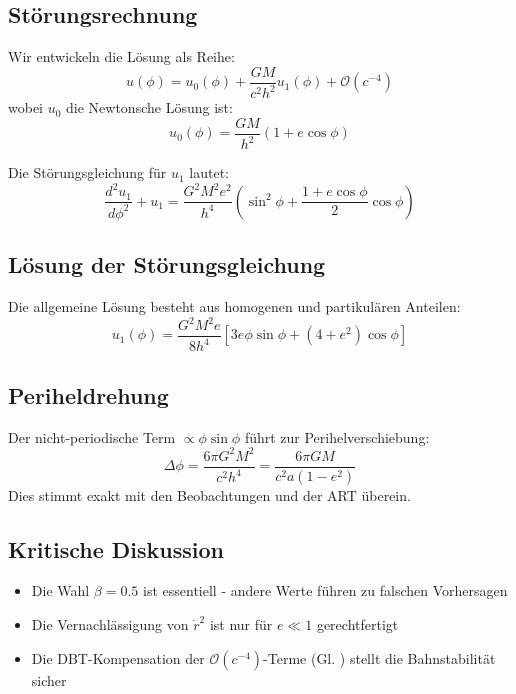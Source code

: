 \subsection{Störungsrechnung}
Wir entwickeln die Lösung als Reihe:
\begin{equation}
u(\phi) = u_0(\phi) + \frac{GM}{c^2h^2}u_1(\phi) + \mathcal{O}(c^{-4})
\end{equation}
wobei $u_0$ die Newtonsche Lösung ist:
\begin{equation}
u_0(\phi) = \frac{GM}{h^2}(1 + e\cos\phi)
\end{equation}

Die Störungsgleichung für $u_1$ lautet:
\begin{equation}
\frac{d^2u_1}{d\phi^2} + u_1 = \frac{G^2M^2e^2}{h^4}\left(\sin^2\phi + \frac{1 + e\cos\phi}{2}\cos\phi\right)
\end{equation}

\subsection{Lösung der Störungsgleichung}
Die allgemeine Lösung besteht aus homogenen und partikulären Anteilen:
\begin{equation}
u_1(\phi) = \frac{G^2M^2e}{8h^4}\left[3e\phi\sin\phi + (4 + e^2)\cos\phi\right]
\end{equation}

\subsection{Periheldrehung}
Der nicht-periodische Term $\propto \phi\sin\phi$ führt zur Perihelverschiebung:
\begin{equation}
\Delta\phi = \frac{6\pi G^2M^2}{c^2h^4} = \frac{6\pi GM}{c^2a(1 - e^2)}
\end{equation}
Dies stimmt exakt mit den Beobachtungen und der ART überein.

\subsection{Kritische Diskussion}
\begin{itemize}
\item Die Wahl $\beta = 0.5$ ist essentiell - andere Werte führen zu falschen Vorhersagen
\item Die Vernachlässigung von $\dot{r}^2$ ist nur für $e \ll 1$ gerechtfertigt
\item Die DBT-Kompensation der $\mathcal{O}(c^{-4})$-Terme (Gl. ) stellt die Bahnstabilität sicher
\end{itemize}

